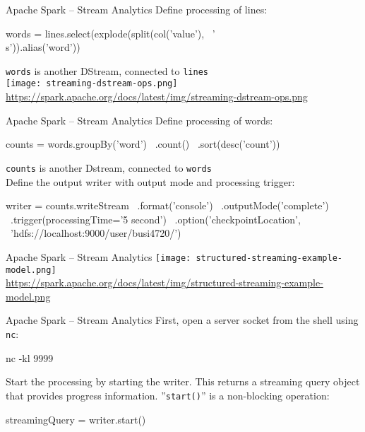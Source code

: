 \documentclass[ignorenonframetext,xcolor=x11names]{beamer}
\begin{document}
\begin{frame}[fragile]{Apache Spark -- Stream Analytics}
Define processing of lines:
\begin{pythoncode}
words = lines.select(explode(split(col('value'), \
    '\\s')).alias('word'))
\end{pythoncode}
\texttt{words} is another DStream, connected to \texttt{lines} \\

\texttt{[image: streaming-dstream-ops.png]}
\scriptsize\url{https://spark.apache.org/docs/latest/img/streaming-dstream-ops.png}\normalsize

\end{frame}


\begin{frame}[fragile]{Apache Spark -- Stream Analytics}
Define processing of words:
\begin{pythoncode}
counts = words.groupBy('word') \
              .count() \
              .sort(desc('count'))
\end{pythoncode}
\texttt{counts} is another Dstream, connected to \texttt{words} \\

Define the output writer with output mode and processing trigger:
\begin{pythoncode}
writer = counts.writeStream \
           .format('console') \
           .outputMode('complete') \
           .trigger(processingTime='5 second') \
           .option('checkpointLocation', \
               'hdfs://localhost:9000/user/busi4720/')
\end{pythoncode}
\end{frame}

\begin{frame}{Apache Spark -- Stream Analytics}
\texttt{[image: structured-streaming-example-model.png]} \\

\scriptsize\url{https://spark.apache.org/docs/latest/img/structured-streaming-example-model.png}
\end{frame}

\begin{frame}[fragile]{Apache Spark -- Stream Analytics}
First, open a server socket from the shell using \texttt{nc}:
\begin{bashcode}
nc -kl 9999
\end{bashcode}
Start the processing by starting the writer. This returns a streaming query object that provides progress information. ''\texttt{start()}'' is a non-blocking operation:
\begin{pythoncode}
streamingQuery = writer.start()
\end{pythoncode}
\end{frame}
\end{document}
